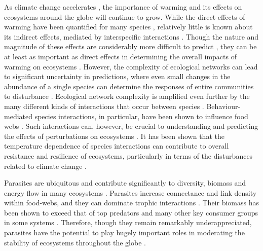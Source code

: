 As climate change accelerates \citep{ipcc2014}, the importance of warming and its effects on ecosystems around the globe will continue to grow. While the direct effects of warming have been quantified for many species \citep{wernberg2012}, relatively little is known about its indirect effects, mediated by interspecific interactions \citep{shaver2000, post2008}. Though the nature and magnitude of these effects are considerably more difficult to predict \citep{sanford1999, wernberg2012}, they can be at least as important as direct effects in determining the overall impacts of warming on ecosystems \citep{chapin1983, post2008, donohue2017, kordas2017}. However, the complexity of ecological networks can lead to significant uncertainty in predictions, where even small changes in the abundance of a single species can determine the responses of entire communities to disturbance \citep{saterberg2013, mrowicki2016}. Ecological network complexity is amplified even further by the many different kinds of interactions that occur between species \citep{kefi2012}. Behaviour-mediated species interactions, in particular, have been shown to influence food webs \citep{schmitz1997}. Such interactions can, however, be crucial to understanding and predicting the effects of perturbations on ecosystems \citep{mcclean2015, suraci2016, donohue2017}. It has been shown that the temperature dependence of species interactions can contribute to overall resistance and resilience of ecosystems, particularly in terms of the disturbances related to climate change \citep{kordas2011, dell2014}. 

Parasites are ubiquitous \citep{torchin2004} and contribute significantly to diversity, biomass and energy flow in many ecosystems \citep{ lafferty2006parasites,  kruis2008, dunne2013, grabner2017}. Parasites increase connectance and link density within food-webs, and they can dominate trophic interactions \citep{lafferty2006parasites, amundsen2009}. Their biomass has been shown to exceed that of top predators and many other key consumer groups in some systems \citep{kruis2008, preston2013}. Therefore, though they remain remarkably underappreciated, parasites have the potential to play hugely important roles in moderating the stability of ecosystems throughout the globe \citep{dunne2013}. 


